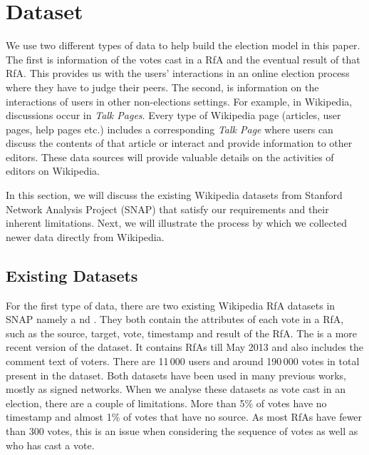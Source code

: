\section{Dataset}
\label{sec:dataset}

We use two different types of data to help build the election model in this paper. The first is information of the votes cast in a RfA and the eventual result of that RfA. This provides us with the users' interactions in an online election process where they have to judge their peers. The second, is information on the interactions of users in other non-elections settings. For example, in Wikipedia, discussions occur in \textit{Talk Pages}. Every type of Wikipedia page (articles, user pages, help pages etc.) includes a corresponding \textit{Talk Page} where users can discuss the contents of that article or interact and provide information to other editors. These data sources will provide valuable details on the activities of editors on Wikipedia.

In this section, we will discuss the existing Wikipedia datasets from Stanford Network Analysis Project (SNAP) \cite{snapnets} that satisfy our requirements and their inherent limitations. Next, we will illustrate the process by which we collected newer data directly from Wikipedia.


\subsection{Existing Datasets}
For the first type of data, there are two existing Wikipedia RfA datasets in SNAP namely \wikielect a
nd \wikirfa. They both contain the attributes of each vote in a RfA, such as the source, target, vote, timestamp and result of the RfA. The \wikirfa is a more recent version of the \wikielect dataset. It contains RfAs till May 2013 and also includes the comment text of voters. There are 11\,000 users and around 190\,000 votes in total present in the \wikirfa dataset. Both datasets have been used in many previous works, mostly as signed networks. When we analyse these datasets as vote cast in an election, there are a couple of limitations. More than 5\% of \wikirfa votes have no timestamp and almost 1\% of votes that have no source. As most RfAs have fewer than 300 votes, this is an issue when considering the sequence of votes as well as who has cast a vote.

